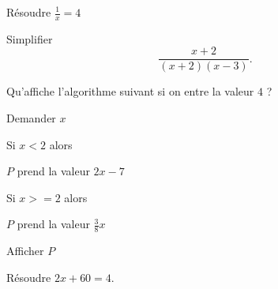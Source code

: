 \begin{MentalActivity}

\begin{mental}
            Résoudre \( \frac{1}{ x }=4\)
\end{mental}

\begin{mental}
            Simplifier
            \begin{equation*}
                \frac{ x+2 }{ (x+2)(x-3) }.
            \end{equation*}
\end{mental}

\begin{mental}
            Qu'affiche l'algorithme suivant si on entre la valeur \( 4\) ?

\begin{fmpage}{0.9\linewidth}

    Demander \( x\)

    Si \( x < 2\) alors

    \hspace{1cm} \( P\) prend la valeur \( 2x-7 \)

    Si \( x >= 2 \) alors

    \hspace{1cm} \( P\) prend la valeur \( \frac{ 3 }{ 8 }x\)

    Afficher \( P\)

\end{fmpage}
\end{mental}

\begin{mental}
                Résoudre \( 2x+60=4\).


\end{mental}


\end{MentalActivity}
